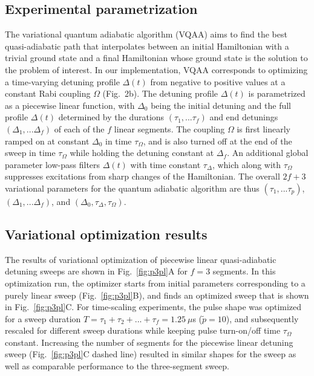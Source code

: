 \documentclass[twocolumn,amssymb,secnumarabic, prl, aps, nofootinbib]{revtex4-1}
\begin{document}
\subsection{Experimental parametrization}
The variational quantum adiabatic algorithm (VQAA) aims to find the best quasi-adiabatic path that interpolates between an initial Hamiltonian with a trivial ground state and a final Hamiltonian whose ground state is the solution to the problem of interest. In our implementation, VQAA corresponds to optimizing a time-varying detuning profile $\Delta(t)$ from negative to positive values at a constant Rabi coupling $\Omega$ (Fig.~2b). The detuning profile $\Delta(t)$ is parametrized as a piecewise linear function, with $\Delta_0$ being the initial detuning and the full profile $\Delta(t)$ determined by the durations $(\tau_1, ... \tau_f)$ and end detunings $(\Delta_1, ... \Delta_f)$ of each of the $f$ linear segments. The coupling $\Omega$ is first linearly ramped on at constant $\Delta_0$ in time $\tau_\Omega$, and is also turned off at the end of the sweep in  time $\tau_\Omega$ while holding the detuning constant at $\Delta_f$. An additional global parameter low-pass filters $\Delta(t)$ with time constant $\tau_\Delta$, which along with $\tau_\Omega$ suppresses excitations from sharp changes of the Hamiltonian. The overall $2f+3$ variational parameters for the quantum adiabatic algorithm are thus $(\tau_1, ... \tau_p)$, $(\Delta_1, ... \Delta_f)$, and $(\Delta_0, \tau_\Delta, \tau_\Omega)$.

\subsection{Variational optimization results}
The results of variational optimization of piecewise linear quasi-adiabatic detuning sweeps are shown in Fig.~\ref{fig:p3pl}A for $f=3$ segments. In this optimization run, the optimizer starts from initial parameters corresponding to a purely linear sweep (Fig.~\ref{fig:p3pl}B), and finds an optimized sweep that is shown in Fig.~\ref{fig:p3pl}C. For time-scaling experiments, the pulse shape was optimized for a sweep duration $T = \tau_1 + \tau_2 + ... +\tau_f = 1.25~\mu$s ($\tilde{p}=10$), and subsequently rescaled for different sweep durations while keeping pulse turn-on/off time $\tau_\Omega$ constant. Increasing the number of segments for the piecewise linear detuning sweep (Fig.~\ref{fig:p3pl}C dashed line) resulted in similar shapes for the sweep as well as comparable performance to the three-segment sweep. 
\end{document}
